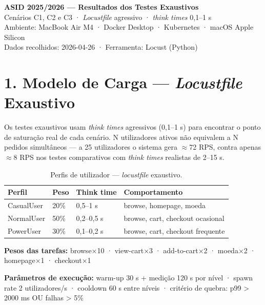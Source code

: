 \documentclass[a4paper,11pt]{article}
\begin{document}
\begin{center}
  {\Large\bfseries\color{headerblue} ASID 2025/2026 — Resultados dos Testes Exaustivos}\\[4pt]
  {\normalsize Cenários C1, C2 e C3 · \textit{Locustfile} agressivo · \textit{think times} 0{,}1--1 s}\\[2pt]
  {\small Ambiente: MacBook Air M4 · Docker Desktop · Kubernetes · macOS Apple Silicon}\\[2pt]
  {\small Dados recolhidos: 2026-04-26 · Ferramenta: Locust (Python)}
\end{center}

\vspace{1em}

\section{1. Modelo de Carga — \textit{Locustfile} Exaustivo}

Os testes exaustivos usam \textit{think times} agressivos (0{,}1--1 s) para encontrar o ponto de saturação real de cada cenário. N utilizadores ativos não equivalem a N pedidos simultâneos — a 25 utilizadores o sistema gera $\approx$72 RPS, contra apenas $\approx$8 RPS nos testes comparativos com \textit{think times} realistas de 2--15 s.

\begin{table}[h]
\centering
\caption{Perfis de utilizador — \textit{locustfile} exaustivo.}
\begin{tabular}{llll}
\toprule
\textbf{Perfil} & \textbf{Peso} & \textbf{Think time} & \textbf{Comportamento} \\
\midrule
CasualUser & 20\% & 0{,}5--1 s   & browse, homepage, moeda \\
NormalUser & 50\% & 0{,}2--0{,}5 s & browse, cart, checkout ocasional \\
PowerUser  & 30\% & 0{,}1--0{,}2 s & browse, cart, checkout frequente \\
\bottomrule
\end{tabular}
\end{table}

\textbf{Pesos das tarefas:} browse×10 · view-cart×3 · add-to-cart×2 · moeda×2 · homepage×1 · checkout×1

\textbf{Parâmetros de execução:} warm-up 30 s + medição 120 s por nível · spawn rate 2 utilizadores/s · cooldown 60 s entre níveis · critério de quebra: p99 > 2000 ms OU falhas > 5\%
\end{document}
